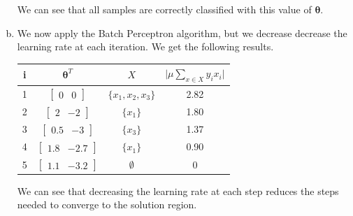 \documentclass[a4paper, 10pt, twoside]{article}
\begin{document}
\begin{enumerate}[a)]
          We can see that all samples are correctly classified with this value of $\bm{\theta}$.

    \item We now apply the Batch Perceptron algorithm, but we decrease decrease the learning rate at each iteration. We get the following results.

          \begin{table}[h]
            \centering
              \begin{tabular}{cccc}
                  i & $\bm{\theta}^T$              & $X$     &  $\vert \mu \sum_{x \in X} y_i x_i \vert$             \\
                  \toprule
                  1 & $\begin{bmatrix} 0 & 0 \end{bmatrix}$ & $\{ x_1, x_2, x_3 \}$ & 2.82\\
                  2 & $\begin{bmatrix} 2 & -2 \end{bmatrix}$ & $\{ x_1 \}$ & 1.80 \\
                  3 & $\begin{bmatrix} 0.5 & -3 \end{bmatrix}$ & $\{ x_3 \}$ & 1.37 \\
                  4 & $\begin{bmatrix} 1.8 & -2.7 \end{bmatrix}$ & $\{ x_1 \}$ & 0.90\\
                  5 & $\begin{bmatrix} 1.1 & -3.2 \end{bmatrix}$ & $ \emptyset $ & 0\\
              \end{tabular}
          \end{table}

          We can see that decreasing the learning rate at each step reduces the steps needed to converge to the solution region.


\end{enumerate}
\end{document}
